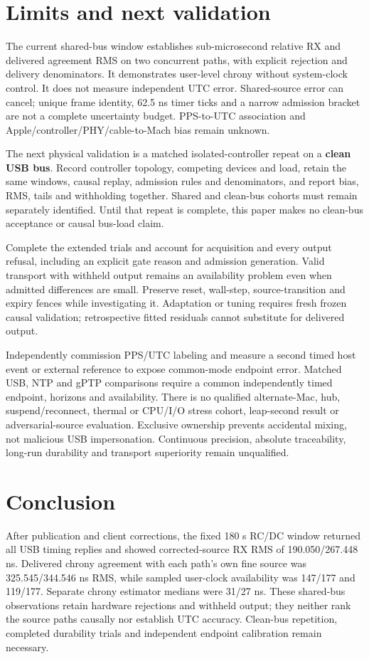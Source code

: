 \documentclass[11pt,letterpaper]{article}
\begin{document}
\section{Limits and next validation}
The current shared-bus window establishes sub-microsecond relative RX and delivered agreement RMS on two concurrent paths, with explicit rejection and delivery denominators. It demonstrates user-level chrony without system-clock control. It does not measure independent UTC error. Shared-source error can cancel; unique frame identity, 62.5 ns timer ticks and a narrow admission bracket are not a complete uncertainty budget. PPS-to-UTC association and Apple/controller/PHY/cable-to-Mach bias remain unknown.

The next physical validation is a matched isolated-controller repeat on a \textbf{clean USB bus}. Record controller topology, competing devices and load, retain the same windows, causal replay, admission rules and denominators, and report bias, RMS, tails and withholding together. Shared and clean-bus cohorts must remain separately identified. Until that repeat is complete, this paper makes no clean-bus acceptance or causal bus-load claim.

Complete the extended trials and account for acquisition and every output refusal, including an explicit gate reason and admission generation. Valid transport with withheld output remains an availability problem even when admitted differences are small. Preserve reset, wall-step, source-transition and expiry fences while investigating it. Adaptation or tuning requires fresh frozen causal validation; retrospective fitted residuals cannot substitute for delivered output.

Independently commission PPS/UTC labeling and measure a second timed host event or external reference to expose common-mode endpoint error. Matched USB, NTP and gPTP comparisons require a common independently timed endpoint, horizons and availability. There is no qualified alternate-Mac, hub, suspend/reconnect, thermal or CPU/I/O stress cohort, leap-second result or adversarial-source evaluation. Exclusive ownership prevents accidental mixing, not malicious USB impersonation. Continuous precision, absolute traceability, long-run durability and transport superiority remain unqualified.

\section{Conclusion}
After publication and client corrections, the fixed 180 s RC/DC window returned all USB timing replies and showed corrected-source RX RMS of 190.050/267.448 ns. Delivered chrony agreement with each path's own fine source was 325.545/344.546 ns RMS, while sampled user-clock availability was 147/177 and 119/177. Separate chrony estimator medians were 31/27 ns. These shared-bus observations retain hardware rejections and withheld output; they neither rank the source paths causally nor establish UTC accuracy. Clean-bus repetition, completed durability trials and independent endpoint calibration remain necessary.
\end{document}
